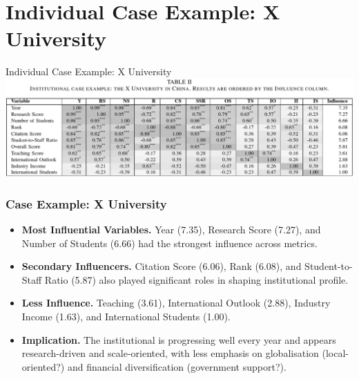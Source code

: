 \documentclass[aspectratio=169, table]{beamer}
\begin{document}
\section{Individual Case Example: X University}

\begin{frame}{Individual Case Example: X University}
	\vspace{10pt}
	\centering
	\includegraphics[width=1.03\linewidth]{figures/table2.png}
\end{frame}

\begin{frame}
	\vspace{20pt}
	\frametitle{Case Example: X University}
	\begin{itemize}
		\item \textbf{Most Influential Variables.} Year (7.35), Research Score (7.27), and Number of Students (6.66) had the strongest influence across metrics.
		\item \textbf{Secondary Influencers.} Citation Score (6.06), Rank (6.08), and Student-to-Staff Ratio (5.87) also played significant roles in shaping institutional profile.
		\item \textbf{Less Influence.} Teaching (3.61), International Outlook (2.88), Industry Income (1.63), and International Students (1.00).
		\item \textbf{Implication.} The institutional is progressing well every year and appears research-driven and scale-oriented, with less emphasis on globalisation (local-oriented?) and financial diversification (government support?).
	\end{itemize}
\end{frame}
\end{document}
